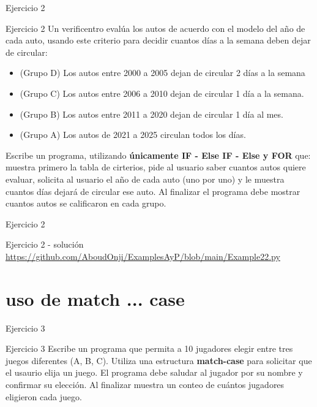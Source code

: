 \documentclass[aspectratio=169,xcolor=dvipsnames]{beamer}
\begin{document}
\begin{frame}{Ejercicio 2}
\footnotesize
\begin{block}{Ejercicio 2}
Un verificentro evalúa los autos de acuerdo con el modelo del año de cada auto, usando este criterio para decidir cuantos días a la semana deben dejar de circular:
\begin{itemize}
    \item (Grupo D) Los autos entre 2000 a 2005 dejan de circular 2 días a la semana
    \item (Grupo C) Los autos entre 2006 a 2010 dejan de circular 1 día a la semana.
    \item (Grupo B) Los autos entre 2011 a 2020 dejan de circular 1 día al mes.
    \item (Grupo A) Los autos de 2021 a 2025 circulan todos los días.
\end{itemize}
Escribe un programa, utilizando \textbf{únicamente IF - Else IF - Else y FOR} que: muestra primero la tabla de cirterios, pide al usuario saber cuantos autos quiere evaluar, solicita al usuario el año de cada auto (uno por uno) y le muestra cuantos días dejará de circular ese auto. Al finalizar el programa debe mostrar cuantos autos se calificaron en cada grupo.
\end{block}
    
\end{frame}

\begin{frame}{Ejercicio 2}
\begin{block}{Ejercicio 2 - solución}
\url{https://github.com/AboudOnji/ExamplesAyP/blob/main/Example22.py}

\end{block}
\end{frame}
\section{uso de match ... case}

\begin{frame}{Ejercicio 3}
\begin{block}{Ejercicio 3}
Escribe un programa que permita a 10 jugadores elegir entre tres juegos diferentes (A, B, C). Utiliza una estructura \textbf{match-case} para solicitar que el usaurio elija un juego. El programa debe saludar al jugador por su nombre y confirmar su elección. Al finalizar muestra un conteo de cuántos jugadores eligieron cada juego.
\end{block}
    
\end{frame}
\end{document}
